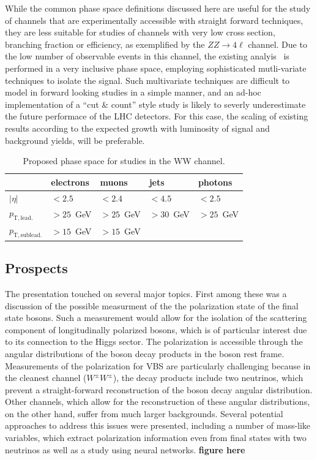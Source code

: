 While the common phase space definitions discussed here are useful for the study of channels that are experimentally accessible with straight forward techniques, they are less suitable for studies of channels with very low cross section, branching fraction or efficiency, as exemplified by the $ZZ\rightarrow 4\ell$ channel. Due to the low number of observable events in this channel, the existing analyis~\cite{CMS-PAS-SMP-17-006} is performed in a very inclusive phase space, employing sophisticated mutli-variate techniques to isolate the signal. Such multivariate techniques are difficult to model in forward looking studies in a simple manner, and an ad-hoc implementation of a  ``cut \& count'' style study is likely to severly underestimate the future performace of the LHC detectors. For this case, the scaling of existing results according to the expected growth with luminosity of signal and background yields, will be preferable.

\begin{table}[htb]
\centering
\begin{tabular}{|l|l|l|l|l|}
    \hline
             & electrons & muons & jets & photons \\
    \hline
    $|\eta|$ & $<2.5$  & $<2.4$ & $<4.5$ & $<2.5$ \\
    $p_\mathrm{T,lead.}$ & $>25$~GeV & $>25$~GeV &$>30$~GeV &$>25$~GeV\\
    $p_\mathrm{T,sublead.}$ & $>15$~GeV & $>15$~GeV &&\\                            
    \hline
  \end{tabular}  

\caption{\label{tab:wg2:phasespace} Proposed phase space for studies in the WW channel.}
\end{table}

\subsection{Prospects}

The presentation touched on several major topics. First among these was a discussion of the possible measurment of the the polarization state of the final state bosons.
Such a measurement would allow for the isolation of the scattering component of longitudinally polarized bosons, which is of particular interest due to its connection to the Higgs sector.
The polarization is accessible through the angular distributions of the boson decay products in the boson rest frame. 
Measurements of the polarization for VBS are particularly challenging because in the cleanest channel ($W^\pm W^\pm$), the decay products include two neutrinos, which prevent a straight-forward reconstruction of the boson decay angular distribution. Other channels, which allow for the reconstruction of these angular distributions, on the other hand, suffer from much larger backgrounds. Several potential approaches to address this issues were presented, including a number of mass-like variables, which extract polarization information even from final states with two neutrinos as well as a study using neural networks. \textbf{figure here}

